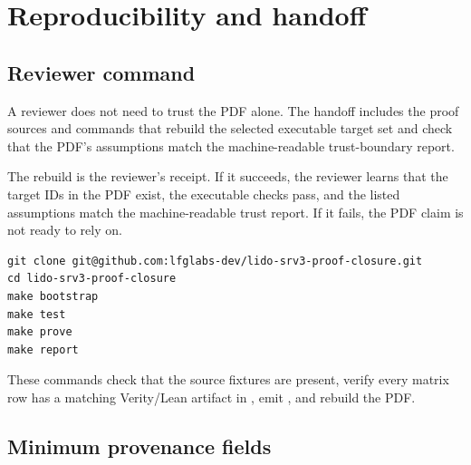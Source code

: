 \section{Reproducibility and handoff}
\label{sec:reproducibility}

\subsection*{Reviewer command}

A reviewer does not need to trust the PDF alone. The handoff includes the proof
sources and commands that rebuild the selected executable target set and check
that the PDF's assumptions match the machine-readable trust-boundary report.

\smallskip
\noindent The rebuild is the reviewer's receipt. If it succeeds, the reviewer
learns that the target IDs in the PDF exist, the executable checks pass, and the
listed assumptions match the machine-readable trust report. If it fails, the PDF
claim is not ready to rely on.

\begin{lstlisting}[language=shell]
git clone git@github.com:lfglabs-dev/lido-srv3-proof-closure.git
cd lido-srv3-proof-closure
make bootstrap
make test
make prove
make report
\end{lstlisting}

\noindent These commands check that the source fixtures are present, verify every matrix row
has a matching Verity/Lean artifact in , emit
, and rebuild the PDF.

\subsection*{Minimum provenance fields}

